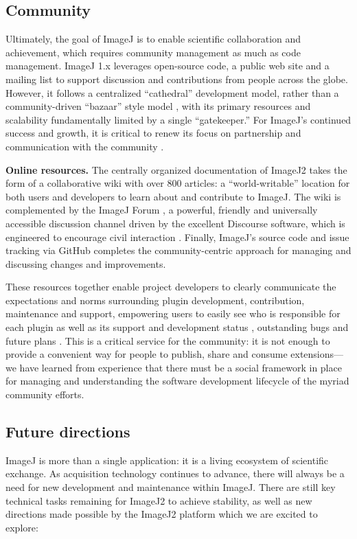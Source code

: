 \documentclass{bmcart}
\begin{document}
\subsection*{Community}

Ultimately, the goal of ImageJ is to enable scientific collaboration and
achievement, which requires community management as much as code management.
ImageJ 1.x leverages open-source code, a public web site and a mailing list to
support discussion and contributions from people across the globe. However, it
follows a centralized ``cathedral'' development model, rather than a
community-driven ``bazaar'' style model \cite{cathedral_bazaar}, with its
primary resources and scalability fundamentally limited by a single
``gatekeeper.'' For ImageJ's continued success and growth, it is critical to
renew its focus on partnership and communication with the community
\cite{imagej_communication}.

\textbf{Online resources.} The centrally organized documentation of ImageJ2
takes the form of a collaborative wiki \cite{imagej_web_site} with over 800
articles: a ``world-writable'' location for both users and developers to learn
about and contribute to ImageJ. The wiki is complemented by the ImageJ Forum
\cite{imagej_forum}, a powerful, friendly and universally accessible discussion
channel driven by the excellent Discourse software, which is engineered to
encourage civil interaction \cite{discourse}. Finally, ImageJ's source code and
issue tracking via GitHub completes the community-centric approach for managing
and discussing changes and improvements.

These resources together enable project developers to clearly communicate the
expectations and norms surrounding plugin development, contribution,
maintenance and support, empowering users to easily see who is responsible for
each plugin as well as its support and development status \cite{imagej_team},
outstanding bugs \cite{imagej_issues} and future plans \cite{imagej_roadmap}.
This is a critical service for the community: it is not enough to provide a
convenient way for people to publish, share and consume extensions---we have
learned from experience that there must be a social framework in place for
managing and understanding the software development lifecycle of the myriad
community efforts.

\subsection*{Future directions}
ImageJ is more than a single application: it is a living ecosystem of
scientific exchange. As acquisition technology continues to advance, there will
always be a need for new development and maintenance within ImageJ. There are
still key technical tasks remaining for ImageJ2 to achieve stability, as well
as new directions made possible by the ImageJ2 platform which we are excited to
explore:
\end{document}
